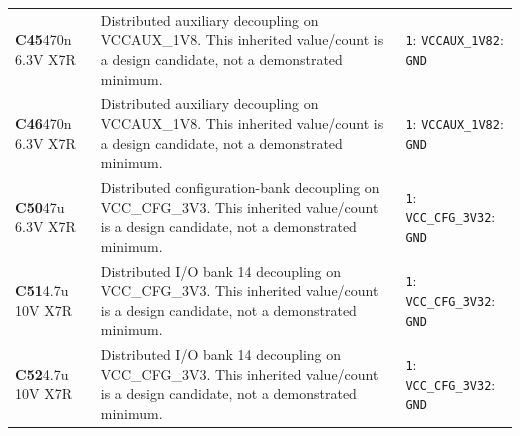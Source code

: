 \documentclass[11pt,a4paper]{article}
\begin{document}
\begin{longtable}{@{}P{27mm}P{84mm}P{57mm}@{}}
\textbf{C45}\newline 470n 6.3V X7R & Distributed auxiliary decoupling on VCCAUX\_1V8. This inherited value/count is a design candidate, not a demonstrated minimum. & \nolinkurl{1}: \nolinkurl{VCCAUX_1V8}\newline \nolinkurl{2}: \nolinkurl{GND} \\
\textbf{C46}\newline 470n 6.3V X7R & Distributed auxiliary decoupling on VCCAUX\_1V8. This inherited value/count is a design candidate, not a demonstrated minimum. & \nolinkurl{1}: \nolinkurl{VCCAUX_1V8}\newline \nolinkurl{2}: \nolinkurl{GND} \\
\textbf{C50}\newline 47u 6.3V X7R & Distributed configuration-bank decoupling on VCC\_CFG\_3V3. This inherited value/count is a design candidate, not a demonstrated minimum. & \nolinkurl{1}: \nolinkurl{VCC_CFG_3V3}\newline \nolinkurl{2}: \nolinkurl{GND} \\
\textbf{C51}\newline 4.7u 10V X7R & Distributed I/O bank 14 decoupling on VCC\_CFG\_3V3. This inherited value/count is a design candidate, not a demonstrated minimum. & \nolinkurl{1}: \nolinkurl{VCC_CFG_3V3}\newline \nolinkurl{2}: \nolinkurl{GND} \\
\textbf{C52}\newline 4.7u 10V X7R & Distributed I/O bank 14 decoupling on VCC\_CFG\_3V3. This inherited value/count is a design candidate, not a demonstrated minimum. & \nolinkurl{1}: \nolinkurl{VCC_CFG_3V3}\newline \nolinkurl{2}: \nolinkurl{GND} \\

\end{longtable}
\end{document}
